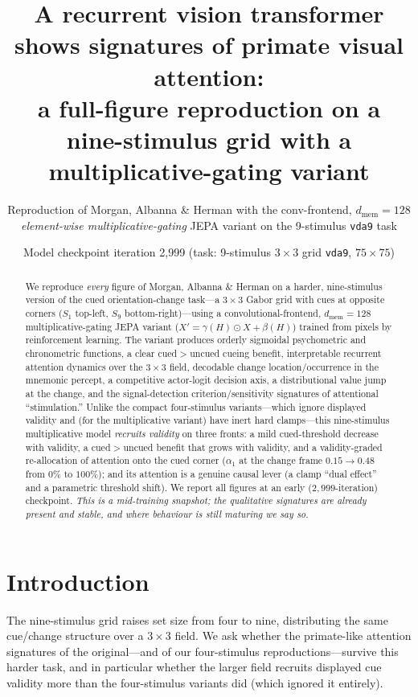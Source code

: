 \documentclass[11pt]{article}
\title{\textbf{A recurrent vision transformer shows signatures of primate visual attention:\\
a full-figure reproduction on a nine-stimulus grid with a multiplicative-gating variant}}
\author{Reproduction of Morgan, Albanna \& Herman with the conv-frontend, $d_{\mathrm{mem}}{=}128$ \emph{element-wise multiplicative-gating} JEPA variant on the 9-stimulus \texttt{vda9} task}
\date{Model checkpoint iteration 2{,}999 (task: 9-stimulus $3\times3$ grid \texttt{vda9}, $75\times75$)}
\begin{document}
\maketitle
\begin{abstract}\noindent
We reproduce \emph{every} figure of Morgan, Albanna \& Herman on a harder, nine-stimulus version of the
cued orientation-change task---a $3\times3$ Gabor grid with cues at opposite corners ($S_1$ top-left,
$S_9$ bottom-right)---using a convolutional-frontend, $d_{\mathrm{mem}}{=}128$ multiplicative-gating JEPA
variant ($X'{=}\gamma(H)\odot X+\beta(H)$) trained from pixels by reinforcement learning. The variant produces orderly sigmoidal
psychometric and chronometric functions, a clear cued$>$uncued cueing benefit, interpretable recurrent
attention dynamics over the $3\times3$ field, decodable change location/occurrence in the mnemonic
percept, a competitive actor-logit decision axis, a distributional value jump at the change, and the
signal-detection criterion/sensitivity signatures of attentional ``stimulation.'' Unlike the compact
four-stimulus variants---which ignore displayed validity and (for the multiplicative variant) have inert
hard clamps---this nine-stimulus multiplicative model \emph{recruits validity} on three fronts: a mild
cued-threshold decrease with validity, a cued$>$uncued benefit that grows with validity, and a
validity-graded re-allocation of attention onto the cued corner ($\alpha_1$ at the change frame
$0.15\to0.48$ from $0\%$ to $100\%$); and its attention is a genuine causal lever (a clamp ``dual
effect'' and a parametric threshold shift). We report all figures at an early ($2{,}999$-iteration)
checkpoint. \emph{This is a mid-training snapshot; the qualitative signatures are already present and
stable, and where behaviour is still maturing we say so.}
\end{abstract}

\section{Introduction}
The nine-stimulus grid raises set size from four to nine, distributing the same cue/change structure
over a $3\times3$ field. We ask whether the primate-like attention signatures of the original---and of
our four-stimulus reproductions---survive this harder task, and in particular whether the larger field
recruits displayed cue validity more than the four-stimulus variants did (which ignored it entirely).
\end{document}
